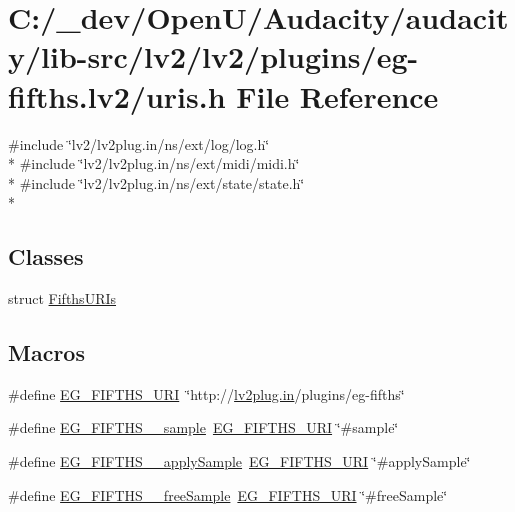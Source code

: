 \hypertarget{eg-fifths_8lv2_2uris_8h}{}\section{C\+:/\+\_\+dev/\+Open\+U/\+Audacity/audacity/lib-\/src/lv2/lv2/plugins/eg-\/fifths.lv2/uris.h File Reference}
\label{eg-fifths_8lv2_2uris_8h}
{\ttfamily \#include \char`\"{}lv2/lv2plug.\+in/ns/ext/log/log.\+h\char`\"{}}\\*
{\ttfamily \#include \char`\"{}lv2/lv2plug.\+in/ns/ext/midi/midi.\+h\char`\"{}}\\*
{\ttfamily \#include \char`\"{}lv2/lv2plug.\+in/ns/ext/state/state.\+h\char`\"{}}\\*
\subsection*{Classes}
\begin{DoxyCompactItemize}
\item 
struct \hyperlink{struct_fifths_u_r_is}{Fifths\+U\+R\+Is}
\end{DoxyCompactItemize}
\subsection*{Macros}
\begin{DoxyCompactItemize}
\item 
\#define \hyperlink{eg-fifths_8lv2_2uris_8h_aaeef56d8066b6533451df6c119009e7d}{E\+G\+\_\+\+F\+I\+F\+T\+H\+S\+\_\+\+U\+RI}~\char`\"{}http\+://\hyperlink{latency_8c_a7d946209d777cb95fe30364b8d321207}{lv2plug.\+in}/plugins/eg-\/fifths\char`\"{}
\item 
\#define \hyperlink{eg-fifths_8lv2_2uris_8h_ac1715b61603f1eda13fb0d611f92edcb}{E\+G\+\_\+\+F\+I\+F\+T\+H\+S\+\_\+\+\_\+sample}~\hyperlink{eg-fifths_8lv2_2uris_8h_aaeef56d8066b6533451df6c119009e7d}{E\+G\+\_\+\+F\+I\+F\+T\+H\+S\+\_\+\+U\+RI} \char`\"{}\#sample\char`\"{}
\item 
\#define \hyperlink{eg-fifths_8lv2_2uris_8h_af9efa89f09731cab7f0db07e72dcecd2}{E\+G\+\_\+\+F\+I\+F\+T\+H\+S\+\_\+\+\_\+apply\+Sample}~\hyperlink{eg-fifths_8lv2_2uris_8h_aaeef56d8066b6533451df6c119009e7d}{E\+G\+\_\+\+F\+I\+F\+T\+H\+S\+\_\+\+U\+RI} \char`\"{}\#apply\+Sample\char`\"{}
\item 
\#define \hyperlink{eg-fifths_8lv2_2uris_8h_a3e5098459bfcf4451cf353ec3c862e43}{E\+G\+\_\+\+F\+I\+F\+T\+H\+S\+\_\+\+\_\+free\+Sample}~\hyperlink{eg-fifths_8lv2_2uris_8h_aaeef56d8066b6533451df6c119009e7d}{E\+G\+\_\+\+F\+I\+F\+T\+H\+S\+\_\+\+U\+RI} \char`\"{}\#free\+Sample\char`\"{}
\end{DoxyCompactItemize}



